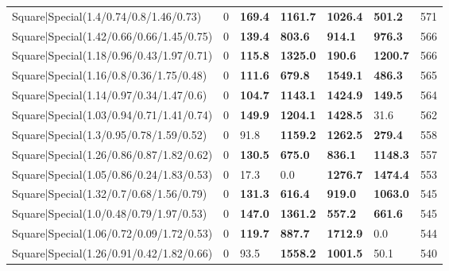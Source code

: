\begin{tabular}{lrllllr}
 Square|Special(1.4/0.74/0.8/1.46/0.73)                        &             0   & \textbf{169.4} & \textbf{1161.7} & \textbf{1026.4} & \textbf{501.2}  &          571 \\
 Square|Special(1.42/0.66/0.66/1.45/0.75)                      &             0   & \textbf{139.4} & \textbf{803.6}  & \textbf{914.1}  & \textbf{976.3}  &          566 \\
 Square|Special(1.18/0.96/0.43/1.97/0.71)                      &             0   & \textbf{115.8} & \textbf{1325.0} & \textbf{190.6}  & \textbf{1200.7} &          566 \\
 Square|Special(1.16/0.8/0.36/1.75/0.48)                       &             0   & \textbf{111.6} & \textbf{679.8}  & \textbf{1549.1} & \textbf{486.3}  &          565 \\
 Square|Special(1.14/0.97/0.34/1.47/0.6)                       &             0   & \textbf{104.7} & \textbf{1143.1} & \textbf{1424.9} & \textbf{149.5}  &          564 \\
 Square|Special(1.03/0.94/0.71/1.41/0.74)                      &             0   & \textbf{149.9} & \textbf{1204.1} & \textbf{1428.5} & 31.6            &          562 \\
 Square|Special(1.3/0.95/0.78/1.59/0.52)                       &             0   & 91.8           & \textbf{1159.2} & \textbf{1262.5} & \textbf{279.4}  &          558 \\
 Square|Special(1.26/0.86/0.87/1.82/0.62)                      &             0   & \textbf{130.5} & \textbf{675.0}  & \textbf{836.1}  & \textbf{1148.3} &          557 \\
 Square|Special(1.05/0.86/0.24/1.83/0.53)                      &             0   & 17.3           & 0.0             & \textbf{1276.7} & \textbf{1474.4} &          553 \\
 Square|Special(1.32/0.7/0.68/1.56/0.79)                       &             0   & \textbf{131.3} & \textbf{616.4}  & \textbf{919.0}  & \textbf{1063.0} &          545 \\
 Square|Special(1.0/0.48/0.79/1.97/0.53)                       &             0   & \textbf{147.0} & \textbf{1361.2} & \textbf{557.2}  & \textbf{661.6}  &          545 \\
 Square|Special(1.06/0.72/0.09/1.72/0.53)                      &             0   & \textbf{119.7} & \textbf{887.7}  & \textbf{1712.9} & 0.0             &          544 \\
 Square|Special(1.26/0.91/0.42/1.82/0.66)                      &             0   & 93.5           & \textbf{1558.2} & \textbf{1001.5} & 50.1            &          540 \\

\end{tabular}
